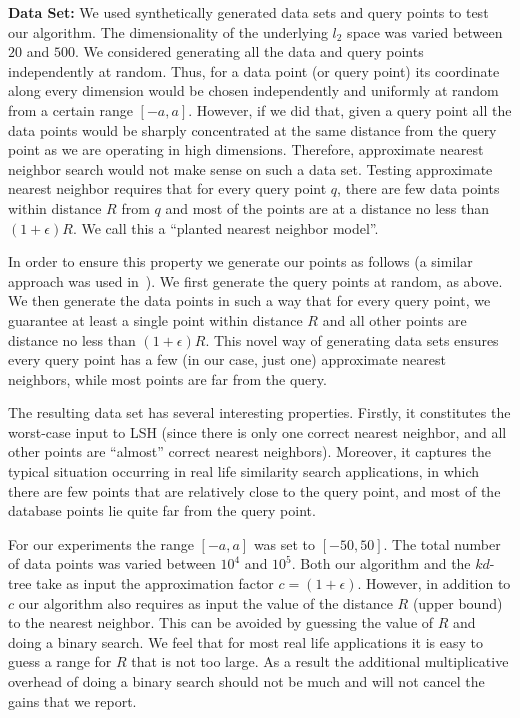 \documentclass[12pt]{article}
\begin{document}
{\noindent \bf Data Set:} We used synthetically generated data sets and
query points to test our algorithm. The dimensionality of the underlying
$l_2$ space was varied between $20$ and $500$. We considered generating
all the data and query points independently at random. Thus, for a data
point (or query point) its coordinate along every dimension would be
chosen independently and uniformly at random from a certain range $[-a,
a]$. However, if we did that, given a query point all the data points
would be sharply concentrated at the same distance from the query point
as we are operating in high dimensions. Therefore, approximate
nearest neighbor search would not make sense on such a data set. Testing
approximate nearest neighbor requires that for every query point $q$,
there are few data points within distance $R$ from $q$ and most of the
points are at a distance no less than $(1+ \epsilon) R$.  We call this a
``planted nearest neighbor model''.


In order to ensure this property we generate our points as follows 
(a similar approach was used in~\cite{Yia2}). We
first generate the query points at random, as above. We then generate
the data points in such a way that for every query point, we guarantee
at least a single point within distance $R$ and all other points are
distance no less than $(1+ \epsilon) R$.  This novel way of
generating data sets ensures every query point has a
few (in our case, just one) approximate nearest neighbors, while most
points are far from the query.

The resulting data set has several interesting properties. Firstly, it 
constitutes the worst-case input to LSH (since there is only one 
correct nearest neighbor, and all other points are ``almost'' correct
nearest neighbors). Moreover, it captures the typical situation occurring in real life similarity search applications, in which there are few points that are relatively close to the query point, and most of the database points lie quite far from the query point.



For our experiments the range $[-a, a]$ was set to $[-50, 50]$.
The total number of data points was varied between $10^4$ and
$10^5$. Both our algorithm and the $kd$-tree take as input the
approximation factor $c = (1+ \epsilon)$. However, in addition to $c$
our algorithm also requires as input the value of the distance $R$
(upper bound) to the nearest neighbor. This can be avoided by guessing
the value of $R$ and doing a binary search.  We feel that for most real
life applications it is easy to guess a range for $R$ that is not too
large. As a result the additional multiplicative overhead of doing a
binary search should not be much and will not cancel the gains that we
report.
\end{document}
